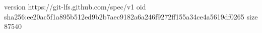version https://git-lfs.github.com/spec/v1
oid sha256:ee20ac5f1a895b512ed9b2b7aec9182a6a246f9272ff155a34ce4a5619df0265
size 87540
